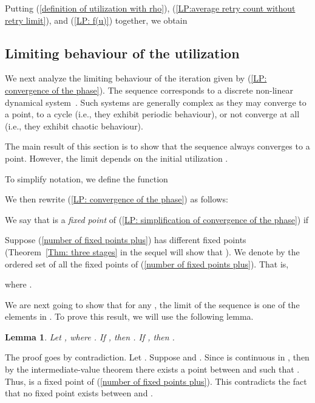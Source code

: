 \documentclass{IEEEtran}
\newtheorem{lemma}{Lemma}
\begin{document}
Putting (\ref{definition of utilization with rho}), (\ref{LP:average retry count without retry limit}), and
(\ref{LP: f(u)}) together, we obtain




\subsection{Limiting behaviour of the utilization}
We next analyze the limiting behaviour of the iteration given by (\ref{LP: convergence of the phase}). The sequence 
corresponds to a discrete non-linear dynamical system~\cite{lynch2004dynamical}. Such systems are generally complex as they may converge to a point,
to a cycle  (i.e., they exhibit periodic behaviour), or not converge at all (i.e., they exhibit chaotic behaviour).

The main result of this section is to show that the sequence  always converges to a point. However, the limit depends on the
initial utilization .

To simplify notation, we define the function


We then rewrite (\ref{LP: convergence of the phase}) as follows:


We say that  is a \emph{fixed point} of (\ref{LP: simplification of convergence of the phase})
if




Suppose (\ref{number of fixed points plus}) has  different fixed points (Theorem~\ref{Thm: three stages} in the sequel will show that ). We denote by  the ordered set of all the fixed points of (\ref{number of fixed points plus}). That is,

where .

We are next going to show that for any , the limit of the sequence  is one of the elements in . To
prove this result, we will use the following lemma.

\begin{lemma} \label{lemma: f(w)>w}
Let , where .
If , then . If , then .
\end{lemma}
\begin{IEEEproof}
The proof goes by contradiction. Let . Suppose  and . Since  is continuous in , then by the intermediate-value theorem there exists a point  between  and  such that  . Thus,  is a
fixed point of (\ref{number of fixed points plus}). This contradicts the fact that no fixed point exists between  and .
\end{IEEEproof}
\end{document}
